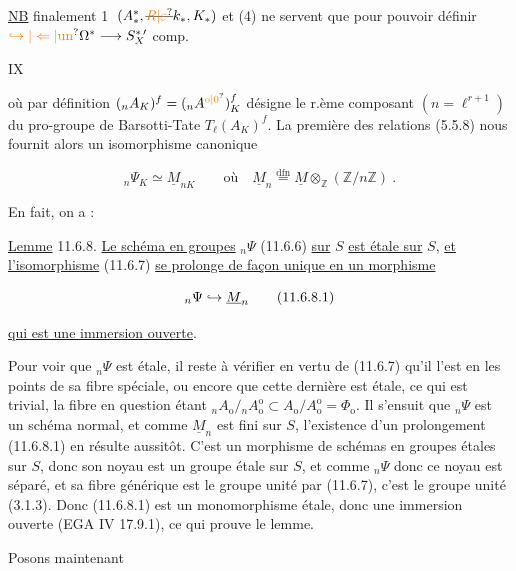 \uline{NB} finalement \textcircled{1} $(A_*^*,\deleted{\unsure{R|\varepsilon}}k_*,K_*)$ et (4) ne servent que pour pouvoir définir $\unsure{\hookrightarrow|\Leftarrow|\text{un}}\Omega^*\longrightarrow S^{*\,\prime}_X$ comp. 


\hfill IX

où par définition $({}_nA_K)^f=({}_nA^{\unsure{\mathrm{o}|0}})^f_K$ désigne le r.ème composant $(n=\ell^{r+1})$ du pro-groupe de Barsotti-Tate $T_\ell(A_K)^f$. La première des relations (5.5.8) nous fournit alors un isomorphisme canonique

\[
{}_n\Psi_K\simeq\underline{M}_{nK}\qquad\text{où}\quad\underline{M}_n\overset{\mathrm{dfn}}{=}\underline{M}\otimes_{\mathbb{Z}}(\mathbb{Z}/n\mathbb{Z})\ .\tag*{(11.6.7)}
\]

En fait, on a :

\uline{Lemme} 11.6.8. \uline{Le schéma en groupes} $ {}_n\Psi$ (11.6.6) \uline{sur} $S$ \uline{est étale sur} $S$, \uline{et l'isomorphisme} (11.6.7) \uline{se prolonge de façon unique en un morphisme}

\[
{}_n\Psi\hookrightarrow\underline{M}_n\tag*{(11.6.8.1)}
\]

\uline{qui est une immersion ouverte}.

Pour voir que $ {}_n\Psi$ est étale, il reste à vérifier en vertu de (11.6.7) qu'il l'est en les points de sa fibre spéciale, ou encore que cette dernière est étale, ce qui est trivial, la fibre en question étant $ {}_nA_{\mathrm{o}}/{}_nA_{\mathrm{o}}^{\mathrm{o}}\subset A_{\mathrm{o}}/A_{\mathrm{o}}^{\mathrm{o}}=\Phi_{\mathrm{o}}$. Il s'ensuit que $ {}_n\Psi$ est un schéma normal, et comme $\underline{M}_n$ est fini sur $S$, l'existence d'un prolongement (11.6.8.1) en résulte aussitôt. C'est un morphisme de schémas en groupes étales sur $S$, donc son noyau est un groupe étale sur $S$, et comme $ {}_n\Psi$ donc ce noyau est séparé, et sa fibre générique est le groupe unité par (11.6.7), c'est le groupe unité (3.1.3). Donc (11.6.8.1) est un monomorphisme étale, donc une immersion ouverte (EGA IV 17.9.1), ce qui prouve le lemme.

Posons maintenant


